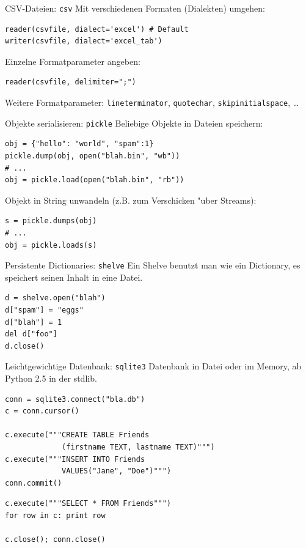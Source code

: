 \begin{frame}[fragile]{CSV-Dateien: \texttt{csv}}
Mit verschiedenen Formaten (Dialekten) umgehen:
\begin{lstlisting}[style=Python]
reader(csvfile, dialect='excel') # Default
writer(csvfile, dialect='excel_tab')
\end{lstlisting}
\vspace*{3mm}
Einzelne Formatparameter angeben:
\begin{lstlisting}[style=Python]
reader(csvfile, delimiter=";")
\end{lstlisting}
Weitere Formatparameter: \texttt{lineterminator}, \texttt{quotechar}, \texttt{skipinitialspace}, \dots
\end{frame}

\begin{frame}[fragile]{Objekte serialisieren: \texttt{pickle}}
Beliebige Objekte in Dateien speichern:
\begin{lstlisting}[style=Python]
obj = {"hello": "world", "spam":1}
pickle.dump(obj, open("blah.bin", "wb"))
# ...
obj = pickle.load(open("blah.bin", "rb"))
\end{lstlisting}
Objekt in String unwandeln (z.B. zum Verschicken "uber Streams):
\begin{lstlisting}[style=Python]
s = pickle.dumps(obj)
# ...
obj = pickle.loads(s)
\end{lstlisting}
\end{frame}

\begin{frame}[fragile]{Persistente Dictionaries: \texttt{shelve}}
Ein Shelve benutzt man wie ein Dictionary, es speichert seinen Inhalt in eine Datei.
\begin{lstlisting}[style=Python]
d = shelve.open("blah")
d["spam"] = "eggs"
d["blah"] = 1
del d["foo"]   
d.close()  
\end{lstlisting}
\end{frame}

\begin{frame}[fragile]{Leichtgewichtige Datenbank: \texttt{sqlite3}}
Datenbank in Datei oder im Memory, ab Python 2.5 in der stdlib.
\begin{lstlisting}[style=Python]
conn = sqlite3.connect("bla.db")
c = conn.cursor()

c.execute("""CREATE TABLE Friends
             (firstname TEXT, lastname TEXT)""")
c.execute("""INSERT INTO Friends
             VALUES("Jane", "Doe")""")
conn.commit()
\end{lstlisting}
\begin{lstlisting}[style=Python]
c.execute("""SELECT * FROM Friends""")
for row in c: print row

c.close(); conn.close()
\end{lstlisting}
\end{frame}

